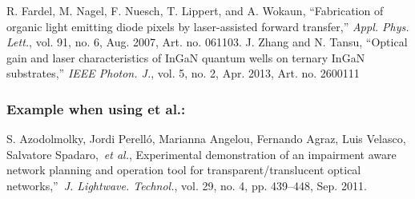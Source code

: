 \documentclass{IEEEoj}
\begin{document}
\begin{thebibliography}{00}
 R. Fardel, M. Nagel, F. Nuesch, T. Lippert, and A. Wokaun, ``Fabrication of organic light emitting diode pixels by laser-assisted forward transfer,'' \textit{Appl. Phys. Lett.}, vol. 91, no. 6, Aug. 2007, Art. no. 061103.
 J. Zhang and N. Tansu, ``Optical gain and laser characteristics of InGaN quantum wells on ternary InGaN substrates,'' \textit{IEEE Photon. J.}, vol. 5, no. 2, Apr. 2013, Art. no. 2600111
\end{thebibliography}

\subsubsection*{Example when using et al.:}

\begin{thebibliography}{00}
 S. Azodolmolky, Jordi Perell\'{o}, Marianna Angelou, Fernando Agraz, Luis Velasco, Salvatore Spadaro,~\textit{et al.}, Experimental demonstration of an impairment aware network planning and operation tool for transparent/translucent optical networks,''~\textit{J. Lightwave. Technol.}, vol. 29, no. 4, pp. 439--448, Sep. 2011.
\end{thebibliography}
\end{document}
